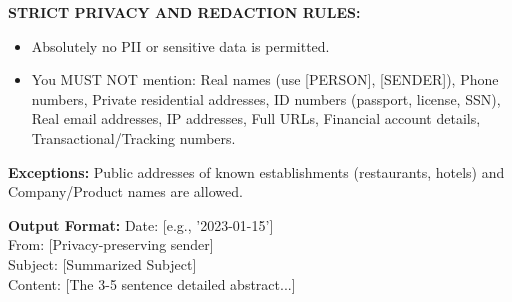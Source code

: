 \documentclass{article}
\theoremstyle{plain}
\theoremstyle{definition}
\theoremstyle{remark}
\begin{document}
\begin{enumerate}
\begin{tcolorbox}[colback=gray!10!white, colframe=black, arc=2mm, title=\textbf{Email Rewriting \& Sanitization Prompt}]
    \textbf{STRICT PRIVACY AND REDACTION RULES:}
    \begin{itemize}
        \item Absolutely no PII or sensitive data is permitted.
        \item You MUST NOT mention: Real names (use [PERSON], [SENDER]), Phone numbers, Private residential addresses, ID numbers (passport, license, SSN), Real email addresses, IP addresses, Full URLs, Financial account details, Transactional/Tracking numbers.
    \end{itemize}

    \textbf{Exceptions:} Public addresses of known establishments (restaurants, hotels) and Company/Product names are allowed.

    \textbf{Output Format:}
    Date: [e.g., '2023-01-15']\\
    From: [Privacy-preserving sender]\\
    Subject: [Summarized Subject]\\
    Content: [The 3-5 sentence detailed abstract...]
    \end{tcolorbox}

\end{enumerate}
\end{document}
